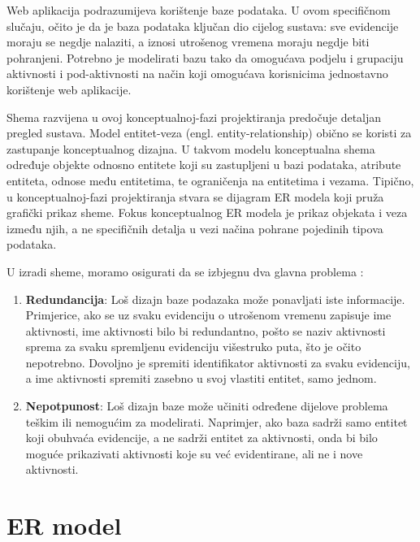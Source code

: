 \documentclass[times, utf8, zavrsni, numeric]{fer}
\begin{document}
Web aplikacija podrazumijeva korištenje baze podataka. U ovom specifičnom slučaju, očito je da je baza podataka ključan dio cijelog sustava: sve evidencije moraju se negdje nalaziti, a iznosi utrošenog vremena moraju negdje biti pohranjeni. Potrebno je modelirati bazu tako da omogućava podjelu i grupaciju aktivnosti i pod-aktivnosti na način koji omogućava korisnicima jednostavno korištenje web aplikacije.

Shema razvijena u ovoj konceptualnoj-fazi projektiranja predočuje detaljan pregled sustava. Model entitet-veza (engl. entity-relationship) obično se koristi za zastupanje konceptualnog dizajna. U takvom modelu konceptualna shema određuje objekte odnosno entitete koji su zastupljeni u bazi podataka, atribute entiteta, odnose među entitetima, te ograničenja na entitetima i vezama. Tipično, u konceptualnoj-fazi projektiranja stvara se dijagram ER modela koji pruža grafički prikaz sheme. Fokus konceptualnog ER modela je prikaz objekata i veza između njih, a ne specifičnih detalja u vezi načina pohrane pojedinih tipova podataka.

U izradi sheme, moramo osigurati da se izbjegnu dva glavna problema \cite{dbsyscon}:
\begin{enumerate}
\item \textbf{Redundancija}: Loš dizajn baze podazaka može ponavljati iste informacije. Primjerice, ako se uz svaku evidenciju o utrošenom vremenu zapisuje ime aktivnosti, ime aktivnosti bilo bi redundantno, pošto se naziv aktivnosti sprema za svaku spremljenu evidenciju višestruko puta, što je očito nepotrebno. Dovoljno je spremiti identifikator aktivnosti za svaku evidenciju, a ime aktivnosti spremiti zasebno u svoj vlastiti entitet, samo jednom.
\item \textbf{Nepotpunost}: Loš dizajn baze može učiniti određene dijelove problema teškim ili nemogućim za modelirati. Naprimjer, ako baza sadrži samo entitet koji obuhvaća evidencije, a ne sadrži entitet za aktivnosti, onda bi bilo moguće prikazivati aktivnosti koje su već evidentirane, ali ne i nove aktivnosti.
\end{enumerate}

\section{ER model}
\end{document}
